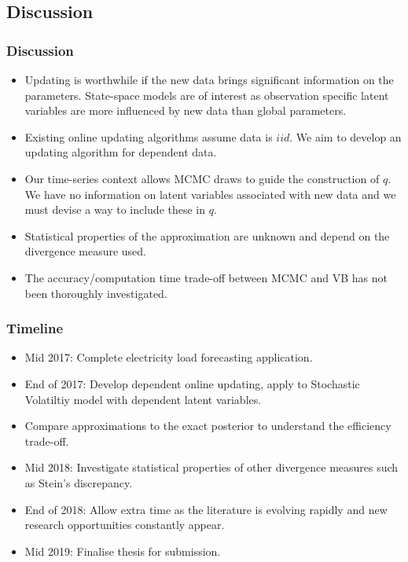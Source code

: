 \documentclass{beamer}\usepackage[]{graphicx}\usepackage[]{color}
\begin{document}
\begin{frame}
\section{Discussion}
\frametitle{Discussion}
\begin{itemize}
\item Updating is worthwhile if the new data brings significant information on the parameters. State-space models are of interest as observation specific latent variables are more influenced by new data than global parameters.
\item Existing online updating algorithms assume data is $iid$. We aim to develop an updating algorithm for dependent data.
\item Our time-series context allows MCMC draws to guide the construction of $q$. We have no information on latent variables associated with new data and we must devise a way to include these in $q$.
\item Statistical properties of the approximation are unknown and depend on the divergence measure used.
\item The accuracy/computation time trade-off between MCMC and VB has not been thoroughly investigated.
\end{itemize}
\end{frame}


\begin{frame}
\frametitle{Timeline}
\begin{itemize}
\item Mid 2017: Complete electricity load forecasting application.
\item End of 2017: Develop dependent online updating, apply to Stochastic Volatiltiy model with dependent latent variables.
\item Compare approximations to the exact posterior to understand the efficiency trade-off.
\item Mid 2018: Investigate statistical properties of other divergence measures such as Stein's discrepancy.
\item End of 2018: Allow extra time as the literature is evolving rapidly and new research opportunities constantly appear.
\item Mid 2019: Finalise thesis for submission.
\end{itemize}
\end{frame}


\begin{frame}


\end{frame}
\end{document}
